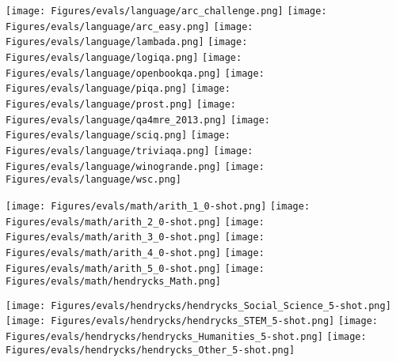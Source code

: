 \documentclass[11pt]{article}
\newcommand{\model}{GPT-NeoX-20B}
\begin{document}
\begin{figure*}
    \centering
    \texttt{[image: Figures/evals/language/arc\_challenge.png]}
    \texttt{[image: Figures/evals/language/arc\_easy.png]}
    \texttt{[image: Figures/evals/language/lambada.png]}
    \texttt{[image: Figures/evals/language/logiqa.png]}
    \texttt{[image: Figures/evals/language/openbookqa.png]}
    \texttt{[image: Figures/evals/language/piqa.png]}
    \texttt{[image: Figures/evals/language/prost.png]}
    \texttt{[image: Figures/evals/language/qa4mre\_2013.png]}
    \texttt{[image: Figures/evals/language/sciq.png]}
    \texttt{[image: Figures/evals/language/triviaqa.png]}
    \texttt{[image: Figures/evals/language/winogrande.png]}
    \texttt{[image: Figures/evals/language/wsc.png]}
    \caption{Zero-shot performance of \model{} compared to GPT-J-6B and FairSeq and OpenAI models on a variety of language modeling benchmarks.}
    \label{fig:language-full}
\end{figure*}


\begin{figure*}
    \centering
    \texttt{[image: Figures/evals/math/arith\_1\_0-shot.png]}
    \texttt{[image: Figures/evals/math/arith\_2\_0-shot.png]}
    \texttt{[image: Figures/evals/math/arith\_3\_0-shot.png]}
    \texttt{[image: Figures/evals/math/arith\_4\_0-shot.png]}
    \texttt{[image: Figures/evals/math/arith\_5\_0-shot.png]}
    \texttt{[image: Figures/evals/math/hendrycks\_Math.png]}
    \caption{Zero-shot performance of \model{} compared to and FairSeq and OpenAI models on arithmetic tasks and MATH. Random performance on these tasks is , and we were unable to find information on median human performance.}
    \label{fig:arithmetic}
\end{figure*}

\begin{figure*}
    \centering
    \texttt{[image: Figures/evals/hendrycks/hendrycks\_Social\_Science\_5-shot.png]}
    \texttt{[image: Figures/evals/hendrycks/hendrycks\_STEM\_5-shot.png]}
    \texttt{[image: Figures/evals/hendrycks/hendrycks\_Humanities\_5-shot.png]}
    \texttt{[image: Figures/evals/hendrycks/hendrycks\_Other\_5-shot.png]}
    \caption{Five-shot performance of \model{} compared to GPT-J-6B and FairSeq and OpenAI models on \citet{hendrycks2020measuring}. Due to financial limitations we were unable to evaluate on the OpenAI API. Instead, we report numbers from \citet{hendrycks2020measuring} with model sizes corrected.}
    \label{fig:hendrycks-5}
\end{figure*}
\end{document}

